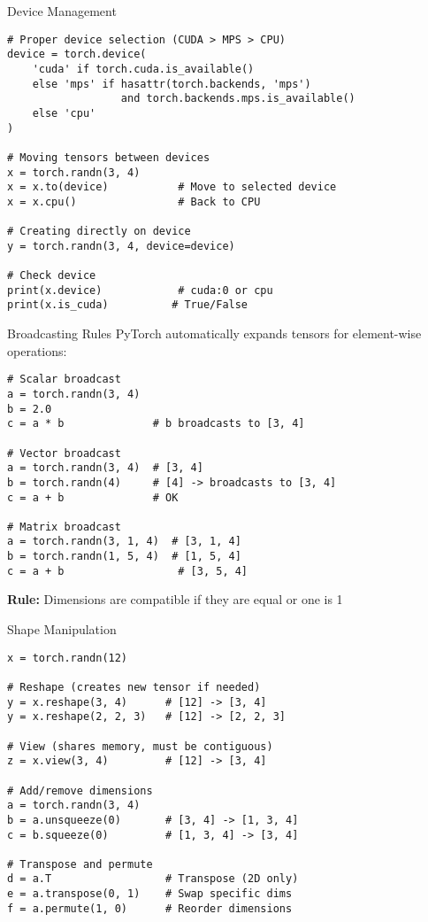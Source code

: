\documentclass[aspectratio=169,10pt]{beamer}
\begin{document}
\begin{frame}[fragile]{Device Management}
\begin{lstlisting}
# Proper device selection (CUDA > MPS > CPU)
device = torch.device(
    'cuda' if torch.cuda.is_available() 
    else 'mps' if hasattr(torch.backends, 'mps') 
                  and torch.backends.mps.is_available()
    else 'cpu'
)

# Moving tensors between devices
x = torch.randn(3, 4)
x = x.to(device)           # Move to selected device
x = x.cpu()                # Back to CPU

# Creating directly on device
y = torch.randn(3, 4, device=device)

# Check device
print(x.device)            # cuda:0 or cpu
print(x.is_cuda)          # True/False
\end{lstlisting}
\end{frame}

\begin{frame}[fragile]{Broadcasting Rules}
PyTorch automatically expands tensors for element-wise operations:

\begin{lstlisting}
# Scalar broadcast
a = torch.randn(3, 4)
b = 2.0
c = a * b              # b broadcasts to [3, 4]

# Vector broadcast
a = torch.randn(3, 4)  # [3, 4]
b = torch.randn(4)     # [4] -> broadcasts to [3, 4]
c = a + b              # OK

# Matrix broadcast
a = torch.randn(3, 1, 4)  # [3, 1, 4]
b = torch.randn(1, 5, 4)  # [1, 5, 4]
c = a + b                  # [3, 5, 4]
\end{lstlisting}

\textbf{Rule:} Dimensions are compatible if they are equal or one is 1
\end{frame}

\begin{frame}[fragile]{Shape Manipulation}
\begin{lstlisting}
x = torch.randn(12)

# Reshape (creates new tensor if needed)
y = x.reshape(3, 4)      # [12] -> [3, 4]
y = x.reshape(2, 2, 3)   # [12] -> [2, 2, 3]

# View (shares memory, must be contiguous)
z = x.view(3, 4)         # [12] -> [3, 4]

# Add/remove dimensions
a = torch.randn(3, 4)
b = a.unsqueeze(0)       # [3, 4] -> [1, 3, 4]
c = b.squeeze(0)         # [1, 3, 4] -> [3, 4]

# Transpose and permute
d = a.T                  # Transpose (2D only)
e = a.transpose(0, 1)    # Swap specific dims
f = a.permute(1, 0)      # Reorder dimensions
\end{lstlisting}
\end{frame}
\end{document}
